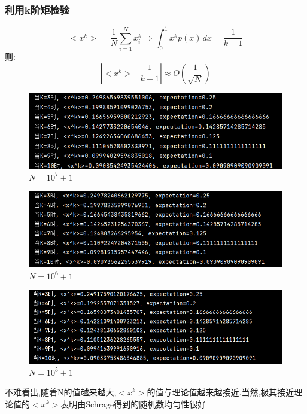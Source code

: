 \documentclass[UTF8]{ctexart}
\begin{document}
\subsubsection{利用k阶矩检验}
\begin{equation}
    <x^k>=\frac{1}{N}\sum_{i = 1}^{N} x_i^k \Rightarrow \int_{0}^{1} x^kp(x) \,dx =\frac{1}{k+1}
\end{equation}
则:
\begin{equation}
    \left\lvert <x^k>-\frac{1}{k+1}\right\rvert\approx O(\frac{1}{\sqrt{N} }) 
\end{equation}
\begin{figure}[htbp]
    \centering
    \includegraphics[scale=0.5]{10^7频率.png}
    \caption{$N=10^7+1$}
\end{figure}
\begin{figure}[htbp]
    \centering
    \includegraphics[scale=0.5]{10^6频率.png}
    \caption{$N=10^6+1$}
\end{figure}
\begin{figure}[htbp]
    \centering
    \includegraphics[scale=0.5]{10^5频率.png}
    \caption{$N=10^5+1$}
\end{figure}

不难看出,随着N的值越来越大,$<x^k>$的值与理论值越来越接近.当然,极其接近理论值的$<x^k>$表明由Schrage得到的随机数均匀性很好
\end{document}
